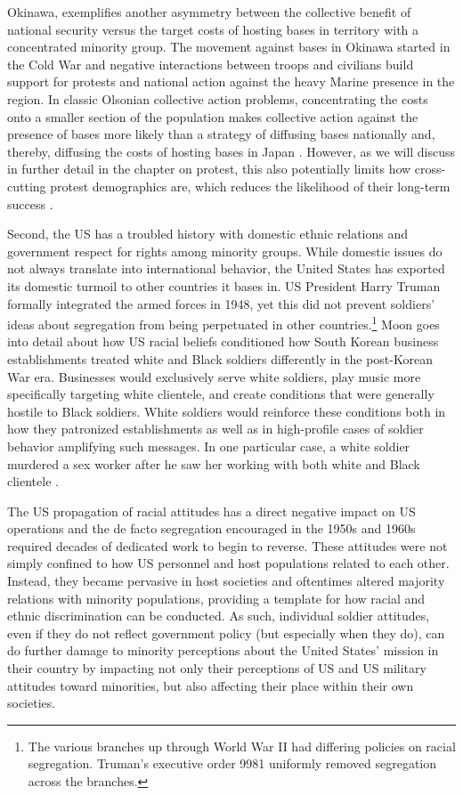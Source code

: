 Okinawa, exemplifies another asymmetry between the collective benefit of national security versus the target costs of hosting bases in territory with a concentrated minority group. The movement against bases in Okinawa started in the Cold War and negative interactions between troops and civilians build support for protests and national action against the heavy Marine presence in the region. In classic Olsonian collective action problems, concentrating the costs onto a smaller section of the population makes collective action against the presence of bases more likely than a strategy of diffusing bases nationally and, thereby, diffusing the costs of hosting bases in Japan \cite{Olson1965}. However, as we will discuss in further detail in the chapter on protest, this also potentially limits how cross-cutting protest demographics are, which reduces the likelihood of their long-term success \cite{Yeo2011}.

Second, the US has a troubled history with domestic ethnic relations and government respect for rights among minority groups. While domestic issues do not always translate into international behavior, the United States has exported its domestic turmoil to other countries it bases in. US President Harry Truman formally integrated the armed forces in 1948, yet this did not prevent soldiers' ideas about segregation from being perpetuated in other countries.\footnote{The various branches up through World War II had differing policies on racial segregation. Truman's executive order 9981 uniformly removed segregation across the branches.}  Moon \citeyear{Moon1997} goes into detail about how US racial beliefs conditioned how South Korean business establishments treated white and Black soldiers differently in the post-Korean War era. Businesses would exclusively serve white soldiers, play music more specifically targeting white clientele, and create conditions that were generally hostile to Black soldiers. White soldiers would reinforce these conditions both in how they patronized establishments as well as in high-profile cases of soldier behavior amplifying such messages. In one particular case, a white soldier murdered a sex worker after he saw her working with both white and Black clientele \cite{Moon1997}. 

The US propagation of racial attitudes has a direct negative impact on US operations and the de facto segregation encouraged in the 1950s and 1960s required decades of dedicated work to begin to reverse. These attitudes were not simply confined to how US personnel and host populations related to each other. Instead, they became pervasive in host societies and oftentimes altered majority relations with minority populations, providing a template for how racial and ethnic discrimination can be conducted. As such, individual soldier attitudes, even if they do not reflect government policy (but especially when they do), can do further damage to minority perceptions about the United States' mission in their country by impacting not only their perceptions of US and US military attitudes toward minorities, but also affecting their place within their own societies. 

